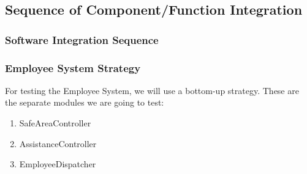 \documentclass{article}
\begin{document}
\subsection{Sequence of Component/Function Integration}

\subsubsection{Software Integration Sequence}

\begin{Large}
\subsubsection{Employee System Strategy}
\end{Large}

For testing the Employee System, we will use a bottom-up strategy. These are the separate modules we are going to test: 
\begin{enumerate}
\item SafeAreaController
\item AssistanceController
\item EmployeeDispatcher
\end{enumerate}
\end{document}
